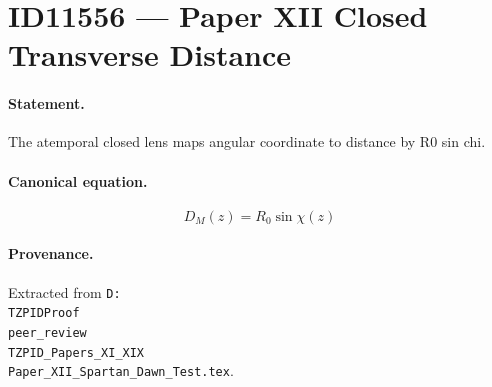 \section*{ID11556 --- Paper XII Closed Transverse Distance}

\paragraph{Statement.}
The atemporal closed lens maps angular coordinate to distance by R0 sin chi.

\paragraph{Canonical equation.}
\[
D_M(z)=R_0\sin\chi(z)
\]

\paragraph{Provenance.}
Extracted from \texttt{D:\\TZPIDProof\\peer\_review\\TZPID\_Papers\_XI\_XIX\\Paper\_XII\_Spartan\_Dawn\_Test.tex}.
